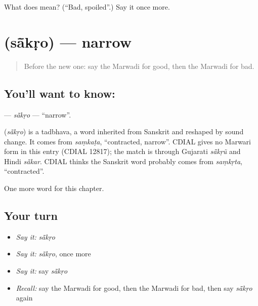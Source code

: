 \begin{tcolorbox}[breakable,colback=teal!4,colframe=teal!35!black,title={Before you move on}]
What does  mean? (\textquotedblleft{}Bad, spoiled\textquotedblright{}.) Say it once more.
\end{tcolorbox}
\section[\texorpdfstring{\mw{सांकड़ो} (sā̃kṛo)}{सांकड़ो (sā̃kṛo)}]{ (sā̃kṛo) — narrow}

\label{lesson:MW-C141-sakro}



\begin{quote}
Before the new one: say the Marwadi for good, then the Marwadi for bad.
\end{quote}

\subsection*{You'll want to know: }
\textbf{} — \emph{sā̃kṛo} — \textquotedblleft{}narrow\textquotedblright{}.

\begin{cousinweb}
\textbf{} (\emph{sā̃kṛo}) is a tadbhava, a word inherited from Sanskrit and reshaped by sound change. It comes from \emph{saṃkaṭa}, \textquotedblleft{}contracted, narrow\textquotedblright{}. CDIAL gives no Marwari form in this entry (CDIAL 12817); the match is through Gujarati \emph{sā̃kṛũ} and Hindi \emph{sā̃kar}. CDIAL thinks the Sanskrit word probably comes from \emph{saṃkṛta}, \textquotedblleft{}contracted\textquotedblright{}.
\end{cousinweb}

\begin{grammarlens}[title={What you've built}]
One more word for this chapter.
\end{grammarlens}

\subsection*{Your turn}
\begin{itemize}
\raggedright
  \item \emph{Say it:} \emph{sā̃kṛo}
  \item \emph{Say it:} \emph{sā̃kṛo}, once more
  \item \emph{Say it:} say \emph{sā̃kṛo}
  \item \emph{Recall:} say the Marwadi for good, then the Marwadi for bad, then say \emph{sā̃kṛo} again
\end{itemize}

